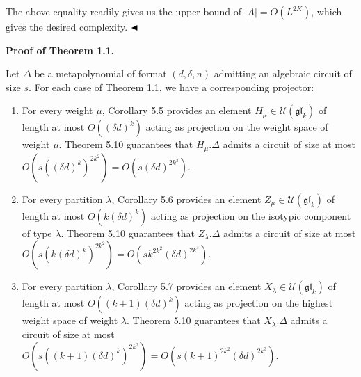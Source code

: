 \documentclass[10pt,a4paper]{article}
\begin{document}
The above equality readily gives us the upper bound of $|A|=O(L^{2K})$, which gives the desired complexity.
$\hfill\blacktriangleleft$






\par\medskip\noindent\textbf{Proof of Theorem 1.1.}\par




Let $\Delta$ be a metapolynomial of format $(d,\delta,n)$ admitting an algebraic circuit of size $s$. For each case of Theorem 1.1, we have a corresponding projector:



\begin{enumerate}


\item 
 


For every weight $\mu$, Corollary 5.5 provides an element $H_{\mu}\in\mathcal{U}(\mathfrak{gl}_{k})$ of length at most $O((\delta d)^{k})$ acting as projection on the weight space of weight $\mu$. Theorem 5.10 guarantees that $H_{\mu}.\Delta$ admits a circuit of size at most $O(s((\delta d)^{k})^{2k^{2}})=O(s(\delta d)^{2k^{3}})$.





\item 
 


For every partition $\lambda$, Corollary 5.6 provides an element $Z_{\mu}\in\mathcal{U}(\mathfrak{gl}_{k})$ of length at most $O(k(\delta d)^{k})$ acting as projection on the isotypic component of type $\lambda$. Theorem 5.10 guarantees that $Z_{\lambda}.\Delta$ admits a circuit of size at most $O(s(k(\delta d)^{k})^{2k^{2}})=O(sk^{2k^{2}}(\delta d)^{2k^{3}})$.





\item 
 


For every partition $\lambda$, Corollary 5.7 provides an element $X_{\lambda}\in\mathcal{U}(\mathfrak{gl}_{k})$ of length at most $O((k+1)(\delta d)^{k})$ acting as projection on the highest weight space of weight $\lambda$. Theorem 5.10 guarantees that $X_{\lambda}.\Delta$ admits a circuit of size at most $O(s((k+1)(\delta d)^{k})^{2k^{2}})=O(s(k+1)^{2k^{2}}(\delta d)^{2k^{3}})$.






\end{enumerate}
\end{document}
